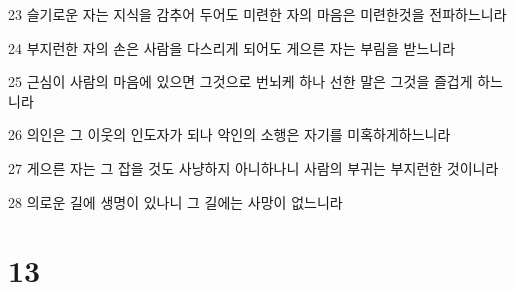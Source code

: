 \par 23 슬기로운 자는 지식을 감추어 두어도 미련한 자의 마음은 미련한것을 전파하느니라
\par 24 부지런한 자의 손은 사람을 다스리게 되어도 게으른 자는 부림을 받느니라
\par 25 근심이 사람의 마음에 있으면 그것으로 번뇌케 하나 선한 말은 그것을 즐겁게 하느니라
\par 26 의인은 그 이웃의 인도자가 되나 악인의 소행은 자기를 미혹하게하느니라
\par 27 게으른 자는 그 잡을 것도 사냥하지 아니하나니 사람의 부귀는 부지런한 것이니라
\par 28 의로운 길에 생명이 있나니 그 길에는 사망이 없느니라

\chapter{13}

